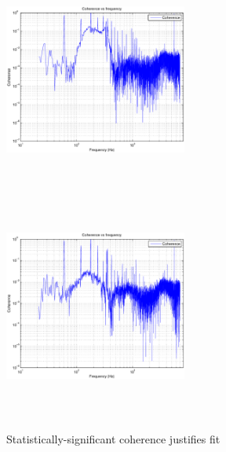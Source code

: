 \begin{figure}
\includegraphics[height=75mm, width=60mm]{clip-MICH-coh.eps}
\includegraphics[height=75mm, width=60mm]{clip-PRC-coh.eps}
\caption{Statistically-significant coherence justifies fit}
\end{figure}
